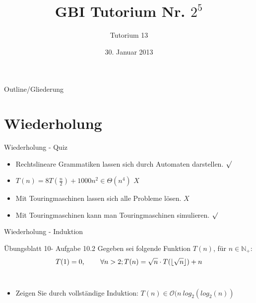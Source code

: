 

\title[Tutorium 13]{GBI Tutorium Nr. $2^5$}
\subtitle{Tutorium 13}
\date{30. Januar 2013}






	\begin{frame}
		\titlepage
	\end{frame}

	\begin{frame}{Outline/Gliederung}
		\tableofcontents
	\end{frame}	
		
	
	
	\section{Wiederholung} 
	\begin{frame} {Wiederholung - Quiz}
		\begin{itemize}
			
			\item Rechtslineare Grammatiken lassen sich durch Automaten darstellen.
			\only<2-> {\color{darkgreen}$\surd$}\\
			\color{black}
			\item $T(n)=8T(\frac{n}{2})+1000n^2 \in \Theta(n^4)$
			\only<3-> {\color{red}$X$}\\
			\color{black}
			
			\item Mit Touringmaschinen lassen sich alle Probleme lösen.
			\only<4-> {\color{red}$X$}\\
			\color{black}
	
			\item Mit Touringmaschinen kann man Touringmaschinen simulieren.
			\only<5-> {\color{darkgreen}$\surd$}\\
			\color{black}
		\end{itemize}
	\end{frame}
	
	
	\begin{frame}{Wiederholung - Induktion}
		\begin{block}{Übungsblatt 10- Aufgabe 10.2}
			Gegeben sei folgende Funktion $T(n)$, für $n \in \mathbb{N}_+$:\\
			\[T(1) = 0 \text{, \hspace{20pt}} \forall n > 2; T(n) = \sqrt{n} \cdot T(\lfloor \sqrt{n} \rfloor ) + n\]\\
			\begin{itemize}
				\item Zeigen Sie durch vollständige Induktion: $T(n) \in \mathcal{O}(n\: log_2(log_2(n))$
			\end{itemize}
		\end{block}
	\end{frame}
	
